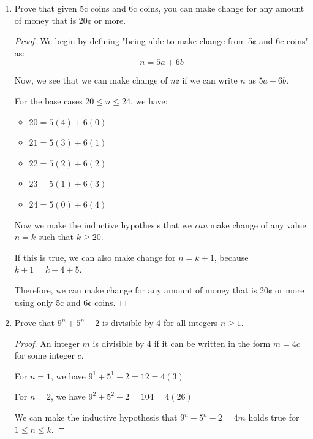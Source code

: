 \documentclass{article}
\begin{document}
\begin{enumerate}
    \item {
        Prove that given 5¢ coins and 6¢ coins, you can make change for any 
        amount of money that is 20¢ or more.

        \begin{proof}
            We begin by defining "being able to make change from 5¢ and 6¢ coins"
            as:
            \[n = 5a + 6b\]
            
            Now, we see that we can make change of \(n\)¢ if we can write \(n\)
            as \(5a + 6b\). 

            For the base cases \(20 \le n \le 24\), we have:
            \begin{itemize}
                \item \(20 = 5(4) + 6(0)\)
                \item \(21 = 5(3) + 6(1)\) 
                \item \(22 = 5(2) + 6(2)\) 
                \item \(23 = 5(1) + 6(3)\) 
                \item \(24 = 5(0) + 6(4)\)  
            \end{itemize}

            Now we make the inductive hypothesis that we \textit{can} make 
            change of any value \(n = k\) such that \(k \ge 20\).

            If this is true, we can also make change for \(n = k + 1\), because 
            \(k + 1 = k - 4 + 5\).

            Therefore, we can make change for any amount of money that is 20¢ or 
            more using only 5¢ and 6¢ coins.
        \end{proof}
    }

    \item {
        Prove that \(9^n + 5^n - 2\) is divisible by 4 for all integers \(n \ge 1\). 

        \begin{proof}
            An integer \(m\) is divisible by 4 if it can be written in the form 
            \(m = 4c\) for some integer \(c\).

            For \(n=1\), we have \(9^1 + 5^1 - 2 = 12 = 4(3)\) 

            For \(n=2\), we have \(9^2 + 5^2 - 2 = 104 = 4(26)\) 

            We can make the inductive hypothesis that \(9^n + 5^n - 2 = 4m\)
            holds true for \(1 \le n \le k\).


\end{proof}}
\end{enumerate}
\end{document}
